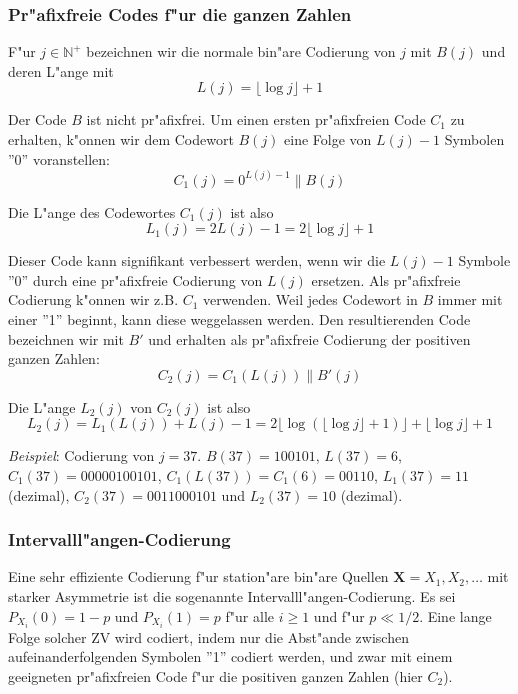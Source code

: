 \documentclass[german, 10pt, a4paper, twocolumn]{scrartcl}
\begin{document}
\subsubsection{Pr"afixfreie Codes f"ur die ganzen Zahlen}

F"ur $j \in \mathbb{N}^+$ bezeichnen wir die normale bin"are Codierung von $j$ mit $B(j)$ und deren L"ange mit
\begin{displaymath}
	L(j) = \lfloor \log j \rfloor + 1
\end{displaymath}

Der Code $B$ ist nicht pr"afixfrei. Um einen ersten pr"afixfreien Code $C_1$ zu erhalten, k"onnen wir dem Codewort $B(j)$ eine Folge von $L(j)-1$ Symbolen ''0'' voranstellen:
\begin{displaymath}
	C_1(j) = 0^{L(j)-1}\parallel B(j)
\end{displaymath}

Die L"ange des Codewortes $C_1(j)$ ist also
\begin{displaymath}
	L_1(j) = 2 L(j) -1 = 2\lfloor \log j \rfloor +1
\end{displaymath}

Dieser Code kann signifikant verbessert werden, wenn wir die $L(j) -1$ Symbole ''0'' durch eine pr"afixfreie Codierung von $L(j)$ ersetzen. Als pr"afixfreie Codierung k"onnen wir z.B. $C_1$ verwenden. Weil jedes Codewort in $B$ immer mit einer ''1'' beginnt, kann diese weggelassen werden. Den resultierenden Code bezeichnen wir mit $B'$ und erhalten als pr"afixfreie Codierung der positiven ganzen Zahlen:
\begin{displaymath}
	C_2(j) = C_1(L(j))\parallel B'(j)
\end{displaymath}

Die L"ange $L_2(j)$ von $C_2(j)$ ist also
\begin{displaymath}
	L_2(j) = L_1(L(j)) + L(j) -1 = 2\lfloor \log (\lfloor \log j \rfloor + 1)\rfloor + \lfloor \log j \rfloor +1
\end{displaymath}

\textit{Beispiel}:
Codierung von $j=37$. $B(37)=100101$, $L(37)=6$, $C_1(37)=00000100101$, $C_1(L(37))=C_1(6)=00110$, $L_1(37)=11$ (dezimal), $C_2(37)=0011000101$ und $L_2(37)=10$ (dezimal).

\subsubsection{Intervalll"angen-Codierung}

Eine sehr effiziente Codierung f"ur station"are bin"are Quellen $\mathbf{X}=X_1,X_2,\ldots$ mit starker Asymmetrie ist die sogenannte Intervalll"angen-Codierung. Es sei $P_{X_i}(0)=1-p$ und $P_{X_i}(1)=p$ f"ur alle $i\geq 1$ und f"ur $p\ll 1/2$. Eine lange Folge solcher ZV wird codiert, indem nur die Abst"ande zwischen aufeinanderfolgenden Symbolen ''1'' codiert werden, und zwar mit einem geeigneten pr"afixfreien Code f"ur die positiven ganzen Zahlen (hier $C_2$).\\
\end{document}
